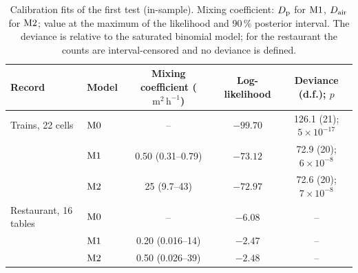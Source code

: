 \begin{table}[tbp]
  \centering\small
  \caption{Calibration fits of the first test (in-sample). Mixing coefficient: $D_{\mathrm{p}}$ for $\mathrm{M1}$, $D_{\mathrm{air}}$ for $\mathrm{M2}$; value at
  the maximum of the likelihood and 90\,\% posterior interval. The deviance is relative to the saturated binomial model; for the restaurant the
  counts are interval-censored and no deviance is defined.}
  \label{s8_outbreaks:tab:calibration}
  \begin{tabular}{@{}llccc@{}}
    \toprule
    Record & Model & Mixing coefficient ($\mathrm{m^2\,h^{-1}}$) & Log-likelihood & Deviance (d.f.); $p$ \\
    \midrule
    Trains, 22 cells       & $\mathrm{M0}$ & --                  & $-99.70$ & 126.1 (21); $5\times10^{-17}$ \\
                           & $\mathrm{M1}$  & 0.50 (0.31--0.79)   & $-73.12$ & 72.9 (20); $6\times10^{-8}$ \\
                           & $\mathrm{M2}$  & 25 (9.7--43)        & $-72.97$ & 72.6 (20); $7\times10^{-8}$ \\
    Restaurant, 16 tables  & $\mathrm{M0}$ & --                  & $-6.08$  & -- \\
                           & $\mathrm{M1}$  & 0.20 (0.016--14)    & $-2.47$  & -- \\
                           & $\mathrm{M2}$  & 0.50 (0.026--39)    & $-2.48$  & -- \\
    \bottomrule
  \end{tabular}
\end{table}

